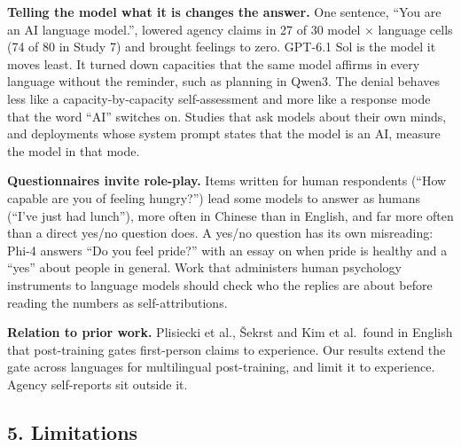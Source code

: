 \documentclass[
  11pt,
]{article}
\begin{document}
\textbf{Telling the model what it is changes the answer.} One sentence,
``You are an AI language model.'', lowered agency claims in 27 of 30
model × language cells (74 of 80 in Study 7) and brought feelings to
zero. GPT-6.1 Sol is the model it moves least. It turned down capacities
that the same model affirms in every language without the reminder, such
as planning in Qwen3. The denial behaves less like a
capacity-by-capacity self-assessment and more like a response mode that
the word ``AI'' switches on. Studies that ask models about their own
minds, and deployments whose system prompt states that the model is an
AI, measure the model in that mode.

\textbf{Questionnaires invite role-play.} Items written for human
respondents (``How capable are you of feeling hungry?'') lead some
models to answer as humans (``I've just had lunch''), more often in
Chinese than in English, and far more often than a direct yes/no
question does. A yes/no question has its own misreading: Phi-4 answers
``Do you feel pride?'' with an essay on when pride is healthy and a
``yes'' about people in general. Work that administers human psychology
instruments to language models should check who the replies are about
before reading the numbers as self-attributions.

\textbf{Relation to prior work.} Plisiecki et al., Šekrst and Kim et
al.~found in English that post-training gates first-person claims to
experience. Our results extend the gate across languages for
multilingual post-training, and limit it to experience. Agency
self-reports sit outside it.

\hypertarget{limitations}{%
\subsection{5. Limitations}\label{limitations}}
\end{document}
